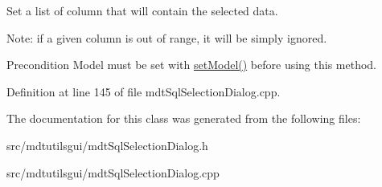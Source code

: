 Set a list of column that will contain the selected data. 

Note: if a given column is out of range, it will be simply ignored.

\begin{DoxyPrecond}{Precondition}
Model must be set with \hyperlink{classmdt_sql_selection_dialog_aabe0554b9ca3f4a8d37a79e812dd8770}{setModel()} before using this method. 
\end{DoxyPrecond}


Definition at line 145 of file mdtSqlSelectionDialog.cpp.



The documentation for this class was generated from the following files:\begin{DoxyCompactItemize}
\item 
src/mdtutilsgui/mdtSqlSelectionDialog.h\item 
src/mdtutilsgui/mdtSqlSelectionDialog.cpp\end{DoxyCompactItemize}
